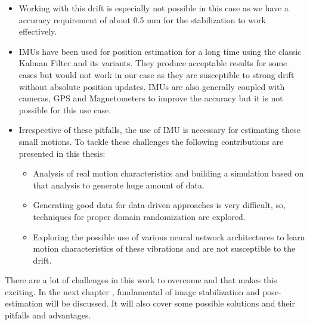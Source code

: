 \begin{itemize}
\item Working with this drift is especially not possible in this case as we have a accuracy requirement of about 0.5 mm for the stabilization to work effectively.

\item IMUs have been used for position estimation for a long time using the classic Kalman Filter and its variants. They produce acceptable results for some cases but would not work in our case as they are susceptible to strong drift without absolute position updates. IMUs are also generally coupled with cameras, GPS and Magnetometers to improve the accuracy but it is not possible for this use case.

\item Irrespective of these pitfalls, the use of IMU is necessary for estimating these small motions. To tackle these challenges the following contributions are presented in this thesis:

\begin{itemize}
    \item Analysis of real motion characteristics and building a simulation based on that analysis to generate huge amount of data.

    \item Generating good data for data-driven approaches is very difficult, so, techniques for proper domain randomization are explored.

    \item Exploring the possible use of various neural network architectures to learn motion characteristics of these vibrations and are not susceptible to the drift.
\end{itemize}

\end{itemize}

There are a lot of challenges in this work to overcome and that makes this exciting. In the next chapter , fundamental of image stabilization and pose-estimation will be discussed. It will also cover some possible solutions and their pitfalls and advantages.

